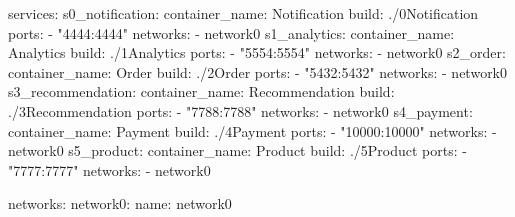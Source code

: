 \begin{yamllisting}
services:
    s0_notification:
        container_name: Notification
        build: ./0Notification
        ports:
            - "4444:4444"
        networks:
            - network0
    s1_analytics:
        container_name: Analytics
        build: ./1Analytics
        ports:
            - "5554:5554"
        networks:
            - network0
    s2_order:
        container_name: Order
        build: ./2Order
        ports:
            - "5432:5432"
        networks:
            - network0
    s3_recommendation:
        container_name: Recommendation
        build: ./3Recommendation
        ports:
            - "7788:7788"
        networks:
            - network0
    s4_payment:
        container_name: Payment
        build: ./4Payment
        ports:
            - "10000:10000"
        networks:
            - network0
    s5_product:
        container_name: Product
        build: ./5Product
        ports:
            - "7777:7777"
        networks:
            - network0

networks:
    network0:
        name: network0
\end{yamllisting}